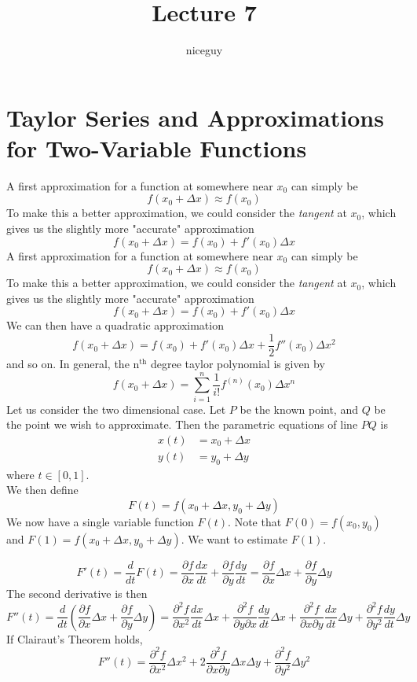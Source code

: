 \documentclass[12pt]{article}
\author{niceguy}
\title{Lecture 7}
\begin{document}
\maketitle

\section{Taylor Series and Approximations for Two-Variable Functions}

A first approximation for a function at somewhere near $x_0$ can simply be
$$f(x_0+\Delta x) \approx f(x_0)$$
To make this a better approximation, we could consider the \textit{tangent} at $x_0$, which gives us the slightly more "accurate" approximation
$$f(x_0+\Delta x) = f(x_0) + f'(x_0)\Delta x$$A first approximation for a function at somewhere near $x_0$ can simply be
$$f(x_0+\Delta x) \approx f(x_0)$$
To make this a better approximation, we could consider the \textit{tangent} at $x_0$, which gives us the slightly more "accurate" approximation
$$f(x_0+\Delta x) = f(x_0) + f'(x_0)\Delta x$$
We can then have a quadratic approximation
$$f(x_0+\Delta x) = f(x_0) + f'(x_0)\Delta x + \frac{1}{2}f''(x_0)\Delta x^2$$
and so on. In general, the n$^{\text{th}}$ degree taylor polynomial is given by
$$f(x_0+\Delta x) = \sum_{i=1}^n \frac{1}{i!}f^{(n)}(x_0) \Delta x^n$$
Let us consider the two dimensional case. Let $P$ be the known point, and $Q$ be the point we wish to approximate. Then the parametric equations of line $PQ$ is
\begin{align*}
	x(t) &= x_0 + \Delta x \\
	y(t) &= y_0 + \Delta y
\end{align*}
where $t \in [0,1]$. \\
We then define
$$F(t) = f(x_0+\Delta x, y_0+\Delta y)$$
We now have a single variable function $F(t)$. Note that $F(0) = f(x_0,y_0)$ and $F(1) = f(x_0+\Delta x, y_0+\Delta y)$. We want to estimate $F(1)$.

$$F'(t) = \frac{d}{dt}F(t) = \frac{\partial f}{\partial x} \frac{dx}{dt} + \frac{\partial f}{\partial y} \frac{dy}{dt} = \frac{\partial f}{\partial x} \Delta x + \frac{\partial f}{\partial y}\Delta y$$
The second derivative is then
$$F''(t) = \frac{d}{dt}\left(\frac{\partial f}{\partial x}\Delta x + \frac{\partial f}{\partial y} \Delta y\right) = \frac{\partial^2 f}{\partial x^2} \frac{dx}{dt} \Delta x + \frac{\partial^2 f}{\partial y \partial x} \frac{dy}{dt} \Delta x + \frac{\partial^2 f}{\partial x \partial y} \frac{dx}{dt} \Delta y + \frac{\partial^2 f}{\partial y^2} \frac{dy}{dt} \Delta y$$
If Clairaut's Theorem holds,
$$F''(t) = \frac{\partial^2 f}{\partial x^2} \Delta x^2 + 2\frac{\partial^2 f}{\partial x \partial y} \Delta x \Delta y + \frac{\partial^2 f}{\partial y^2} \Delta y^2$$
\end{document}

